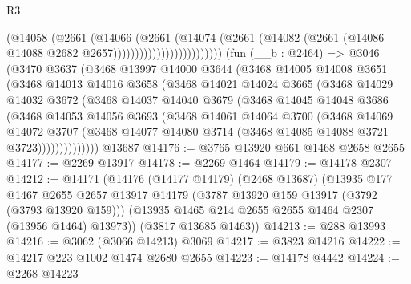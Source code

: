 \begin{lexlean}{R3}
\begin{coremodule}
                                    (@14058
                                      (@2661
                                        (@14066
                                          (@2661
                                            (@14074
                                              (@2661
                                                (@14082
                                                  (@2661
                                                    (@14086
                                                      @14088
                                                      @2682
                                                      @2657)))))))))))))))))))))))))
    (fun (__b : @2464) =>
    @3046
      (@3470
        @3637
        (@3468
          @13997
          @14000
          @3644
          (@3468
            @14005
            @14008
            @3651
            (@3468
              @14013
              @14016
              @3658
              (@3468
                @14021
                @14024
                @3665
                (@3468
                  @14029
                  @14032
                  @3672
                  (@3468
                    @14037
                    @14040
                    @3679
                    (@3468
                      @14045
                      @14048
                      @3686
                      (@3468
                        @14053
                        @14056
                        @3693
                        (@3468
                          @14061
                          @14064
                          @3700
                          (@3468
                            @14069
                            @14072
                            @3707
                            (@3468
                              @14077
                              @14080
                              @3714
                              (@3468 @14085 @14088 @3721 @3723))))))))))))))
    @13687
@14176 := @3765 @13920 @661 @1468 @2658 @2655
@14177 := @2269 @13917
@14178 := @2269 @1464
@14179 := @14178 @2307
@14212 := @14171
    (@14176
      (@14177 @14179)
      (@2468 @13687)
      (@13935
        @177
        @1467
        @2655
        @2657
        @13917
        @14179
        (@3787 @13920 @159 @13917 (@3792 (@3793 @13920 @159)))
        (@13935 @1465 @214 @2655 @2655 @1464 @2307 (@13956 @1464) @13973))
      (@3817 @13685 @1463))
@14213 := @288 @13993
@14216 := @3062 (@3066 @14213) @3069
@14217 := @3823 @14216
@14222 := @14217 @223 @1002 @1474 @2680 @2655
@14223 := @14178 @4442
@14224 := @2268 @14223

\end{coremodule}
\end{lexlean}
